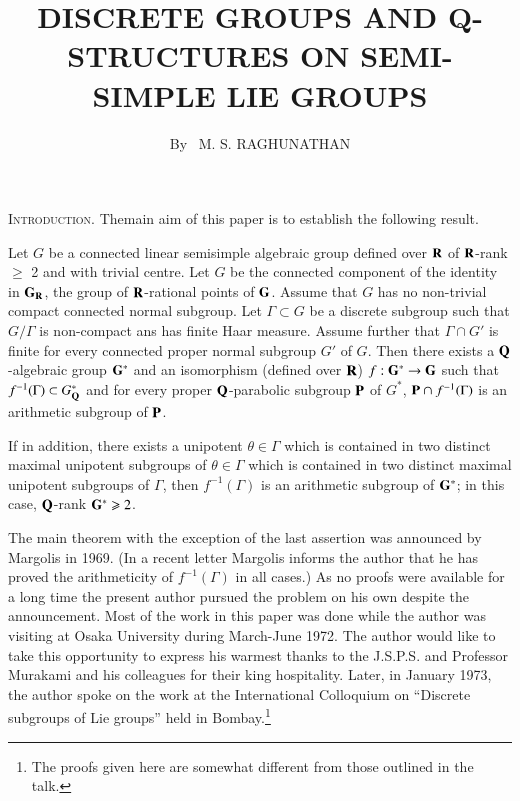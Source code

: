 \title{DISCRETE GROUPS AND Q-STRUCTURES ON SEMI-SIMPLE LIE GROUPS}

\author{By~ M. S. RAGHUNATHAN}

\date{}
\maketitle


\setcounter{pageoriginal}{224}

\noindent
\textsc{Introduction.} The\pageoriginale main aim of this paper is to establish the following result.

\begin{maintheorem*}
Let $G$ be a connected linear semisimple algebraic group defined over $\mathbf{R}$ of $\mathbf{R}$-rank $\geqslant$ 2 and with trivial centre. Let $G$ be the connected component of the identity in $\mathbf{G}_{\mathbf{R}}$, the group of $\mathbf{R}$-rational points of $\mathbf{G}$. Assume that $G$ has no non-trivial compact connected normal subgroup. Let $\Gamma \subset G$ be a discrete subgroup such that $G/\Gamma$ is non-compact ans has finite Haar measure. Assume further that $\Gamma \cap G'$ is finite for every connected proper normal subgroup $G'$ of $G$. Then there exists a $\mathbf{Q}$-algebraic group $\mathbf{G}^\ast$ and an isomorphism (defined over $\mathbf{R}$)  $f: \mathbf{G}^\ast \to \mathbf{G}$ such that $f^{-1} (\Gamma) \subset G^\ast_{\mathbf{Q}}$ and for every proper $\mathbf{Q}$-parabolic subgroup $\mathbf{P}$ of $G^\ast$, $\mathbf{P} \cap f^{-1} (\Gamma)$ is an arithmetic subgroup of $\mathbf{P}$.

If in addition, there exists a unipotent $\theta \in \Gamma$ which is contained in two distinct maximal unipotent subgroups of $\theta \in \Gamma$ which is contained in two distinct maximal unipotent subgroups of $\Gamma$, then $f^{-1}(\Gamma)$ is an arithmetic subgroup of $\mathbf{G}^\ast$; in this case, $\mathbf{Q}$-rank $\mathbf{G}^\ast \geqslant 2$.
\end{maintheorem*}

The main theorem with the exception of the last assertion was announced by Margolis \cite{art9-key1} in 1969. (In a recent letter Margolis informs the author that he has proved the arithmeticity of $f^{-1}(\Gamma)$ in all cases.) As no proofs were available for a long time the present author pursued the problem on his own despite the announcement. Most of the work in this paper was done while the author was visiting at Osaka University during March-June 1972. The author would like to take this opportunity to express his warmest thanks to the J.S.P.S. and Professor Murakami and his colleagues for their king hospitality. Later, in January 1973, the author spoke on the work at the International Colloquium on ``Discrete subgroups of Lie groups'' held in Bombay.\footnote{The proofs given here are somewhat different from those outlined in the talk.}

